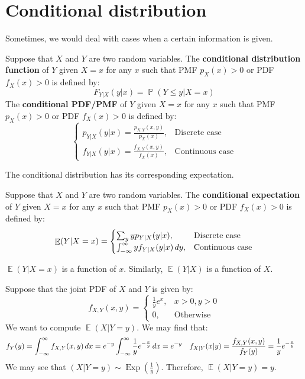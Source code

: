 \documentclass{huhtakm-template-book-v2}
\DeclareMathOperator{\prob}{\mathbb{P}}
\DeclareMathOperator{\E}{\mathbb{E}}
\DeclareMathOperator{\Exp}{Exp}
\begin{document}
\section{Conditional distribution}
Sometimes, we would deal with cases when a certain information is given. 
\begin{defn}
	Suppose that $X$ and $Y$ are two random variables. The \textbf{conditional distribution function} of $Y$ given $X=x$ for any $x$ such that PMF $p_{X}(x)>0$ or PDF $f_{X}(x)>0$ is defined by:
	\begin{equation*}
		F_{Y|X}(y|x)=\prob(Y\leq y|X=x)
	\end{equation*}
	The \textbf{conditional PDF/PMF} of $Y$ given $X=x$ for any $x$ such that PMF $p_{X}(x)>0$ or PDF $f_{X}(x)>0$ is defined by:
	\begin{equation*}
		\begin{cases}
			p_{Y|X}(y|x)=\frac{p_{X,Y}(x,y)}{p_{X}(x)}, &\text{Discrete case}\\
			f_{Y|X}(y|x)=\frac{f_{X,Y}(x,y)}{f_{X}(x)}, &\text{Continuous case}
		\end{cases}
	\end{equation*}
\end{defn}
The conditional distribution has its corresponding expectation.
\begin{defn}
	Suppose that $X$ and $Y$ are two random variables. The \textbf{conditional expectation} of $Y$ given $X=x$ for any $x$ such that PMF $p_{X}(x)>0$ or PDF $f_{X}(x)>0$ is defined by:
	\begin{equation*}
		\E(Y|X=x)=\begin{cases}
			\sum_{y}yp_{Y|X}(y|x), &\text{Discrete case}\\
			\intinfty yf_{Y|X}(y|x)\,dy, &\text{Continuous case}
		\end{cases}
	\end{equation*}
\end{defn}
\begin{rem}
	$\E(Y|X=x)$ is a function of $x$. Similarly, $\E(Y|X)$ is a function of $X$.
\end{rem}
\begin{eg}
	Suppose that the joint PDF of $X$ and $Y$ is given by:
	\begin{equation*}
		f_{X,Y}(x,y)=\begin{cases}
			\frac{1}{y}e^{x}, &x>0, y>0\\
			0, &\text{Otherwise}
		\end{cases}
	\end{equation*}
	We want to compute $\E(X|Y=y)$. We may find that:
	\begin{align*}
		f_{Y}(y)&=\int_{-\infty}^{\infty} f_{X,Y}(x,y)\,dx=e^{-y}\int_{-\infty}^{\infty}\frac{1}{y}e^{-\frac{x}{y}}\,dx=e^{-y} & f_{X|Y}(x|y)&=\frac{f_{X,Y}(x,y)}{f_{Y}(y)}=\frac{1}{y}e^{-\frac{x}{y}}
	\end{align*}
	We may see that $(X|Y=y)\sim\Exp(\frac{1}{y})$. Therefore, $\E(X|Y=y)=y$.
\end{eg}
\end{document}
